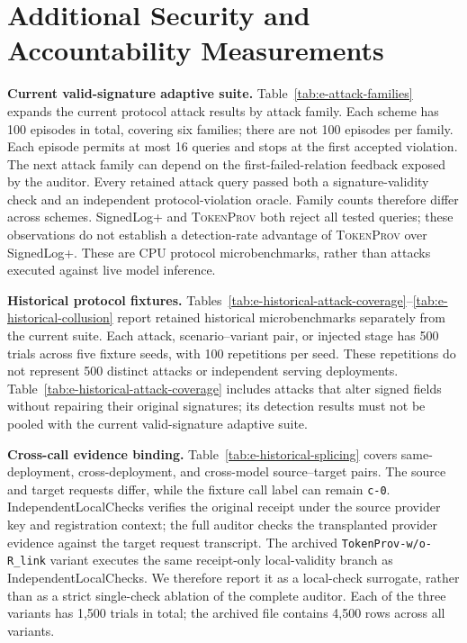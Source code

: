 \section{Additional Security and Accountability Measurements}
\label{app:e-security-accountability}

\noindent\textbf{Current valid-signature adaptive suite.}
Table~\ref{tab:e-attack-families} expands the current protocol attack results
by attack family. Each scheme has 100 episodes in total, covering six families;
there are not 100 episodes per family. Each episode permits at most 16 queries
and stops at the first accepted violation. The next attack family can depend on
the first-failed-relation feedback exposed by the auditor. Every retained attack
query passed both a signature-validity check and an independent protocol-violation
oracle. Family counts therefore differ across schemes. SignedLog+ and
\textsc{TokenProv} both reject all tested queries; these observations do not
establish a detection-rate advantage of \textsc{TokenProv} over SignedLog+.
These are CPU protocol microbenchmarks, rather than attacks executed against
live model inference.



\noindent\textbf{Historical protocol fixtures.}
Tables~\ref{tab:e-historical-attack-coverage}--\ref{tab:e-historical-collusion}
report retained historical microbenchmarks separately from the current suite.
Each attack, scenario--variant pair, or injected stage has 500 trials across
five fixture seeds, with 100 repetitions per seed. These repetitions do not
represent 500 distinct attacks or independent serving deployments.
Table~\ref{tab:e-historical-attack-coverage} includes attacks that alter signed
fields without repairing their original signatures; its detection results
must not be pooled with the current valid-signature adaptive suite.



\noindent\textbf{Cross-call evidence binding.}
Table~\ref{tab:e-historical-splicing} covers same-deployment, cross-deployment,
and cross-model source--target pairs. The source and target requests differ,
while the fixture call label can remain \texttt{c-0}.
IndependentLocalChecks verifies the original receipt under the source
provider key and registration context; the full auditor checks the transplanted
provider evidence against the target request transcript.
The archived \texttt{TokenProv-w/o-R\_link} variant executes the same receipt-only
local-validity branch as IndependentLocalChecks. We therefore report it as a
local-check surrogate, rather than as a strict single-check ablation of the
complete auditor. Each of the three variants has 1,500 trials in total;
the archived file contains 4,500 rows across all variants.


